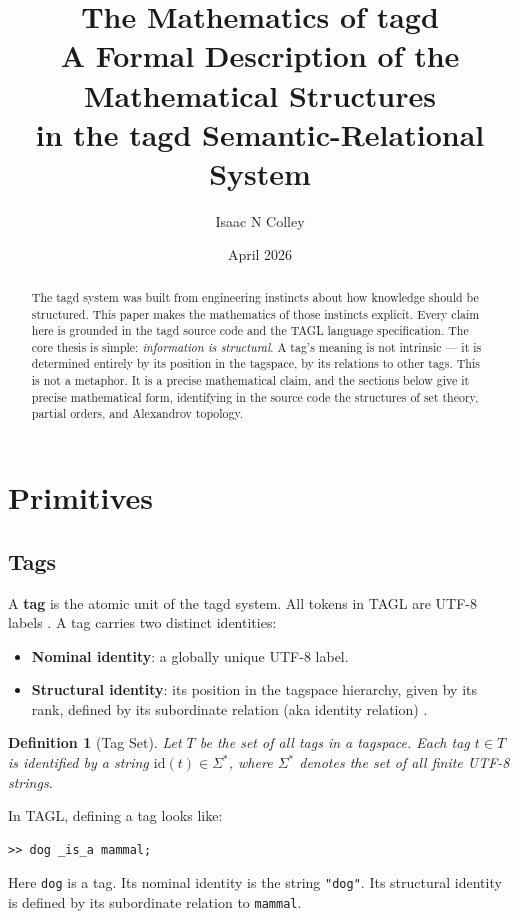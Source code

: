 \documentclass{article}
\title{\textbf{The Mathematics of tagd}\\
\large A Formal Description of the Mathematical Structures\\
in the tagd Semantic-Relational System}
\author{Isaac N Colley}
\date{April 2026}
\newtheorem{definition}{Definition}[section]
\begin{document}
\maketitle

\begin{abstract}
The tagd system was built from engineering instincts about how knowledge should
be structured. This paper makes the mathematics of those instincts explicit.
Every claim here is grounded in the tagd source code and the TAGL language
specification. The core thesis is simple: \emph{information is structural}. A
tag's meaning is not intrinsic --- it is determined entirely by its position in
the tagspace, by its relations to other tags. This is not a metaphor. It is a
precise mathematical claim, and the sections below give it precise mathematical
form, identifying in the source code the structures of set theory, partial
orders, and Alexandrov topology.
\end{abstract}

\tableofcontents
\bigskip

\section{Primitives}

\subsection{Tags}

A \textbf{tag} is the atomic unit of the tagd system. All tokens in TAGL are
UTF-8 labels \cite{readme}. A tag carries two distinct identities:

\begin{itemize}
  \item \textbf{Nominal identity}: a globally unique UTF-8 label.
  \item \textbf{Structural identity}: its position in the tagspace hierarchy,
        given by its rank, defined by its subordinate relation (aka identity
        relation) \cite{spec}.
\end{itemize}

\begin{definition}[Tag Set]
Let $T$ be the set of all tags in a tagspace. Each tag $t \in T$ is identified
by a string $\mathrm{id}(t) \in \Sigma^*$, where $\Sigma^*$ denotes the set of
all finite UTF-8 strings.
\end{definition}

In TAGL, defining a tag looks like:
\begin{lstlisting}[style=tagl, caption={Defining a tag via a subordinate relation}]
>> dog _is_a mammal;
\end{lstlisting}
Here \texttt{dog} is a tag. Its nominal identity is the string \texttt{"dog"}.
Its structural identity is defined by its subordinate relation to
\texttt{mammal}.
\end{document}
